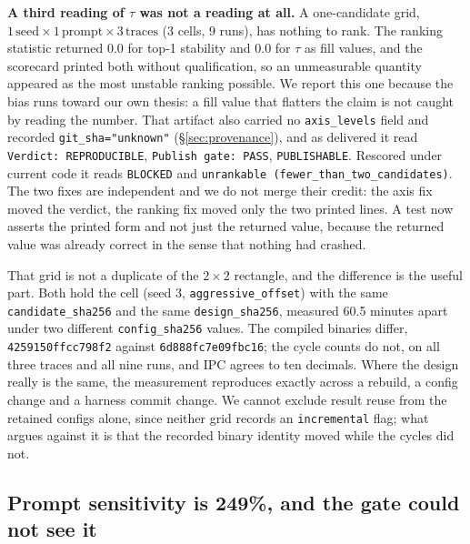 \documentclass[10pt,twocolumn]{article}
\begin{document}
\textbf{A third reading of $\tau$ was not a reading at all.} A one-candidate grid,
$1\,\text{seed}\times1\,\text{prompt}\times3\,\text{traces}$ (3 cells, 9 runs), has
nothing to rank. The ranking statistic returned $0.0$ for top-1 stability and $0.0$
for $\tau$ as fill values, and the scorecard printed both without qualification, so an
unmeasurable quantity appeared as the most unstable ranking possible. We report this
one because the bias runs toward our own thesis: a fill value that flatters the claim
is not caught by reading the number. That artifact also carried no
\texttt{axis\_levels} field and recorded \texttt{git\_sha="unknown"}
(\S\ref{sec:provenance}), and as delivered it read \texttt{Verdict: REPRODUCIBLE},
\texttt{Publish gate: PASS}, \texttt{PUBLISHABLE}. Rescored under current code it reads
\texttt{BLOCKED} and \texttt{unrankable (fewer\_than\_two\_candidates)}. The two fixes
are independent and we do not merge their credit: the axis fix moved the verdict, the
ranking fix moved only the two printed lines. A test now asserts the printed form and
not just the returned value, because the returned value was already correct in the
sense that nothing had crashed.

That grid is not a duplicate of the $2\times2$ rectangle, and the difference is the
useful part. Both hold the cell (seed 3, \texttt{aggressive\_offset}) with the same
\texttt{candidate\_sha256} and the same \texttt{design\_sha256}, measured 60.5 minutes
apart under two different \texttt{config\_sha256} values. The compiled binaries differ,
\texttt{4259150ffcc798f2} against \texttt{6d888fc7e09fbc16}; the cycle counts do not,
on all three traces and all nine runs, and IPC agrees to ten decimals. Where the design
really is the same, the measurement reproduces exactly across a rebuild, a config
change and a harness commit change. We cannot exclude result reuse from the retained
configs alone, since neither grid records an \texttt{incremental} flag; what argues
against it is that the recorded binary identity moved while the cycles did not.

\subsection{Prompt sensitivity is 249\%, and the gate could not see it}
\label{sec:prompt}
\end{document}
